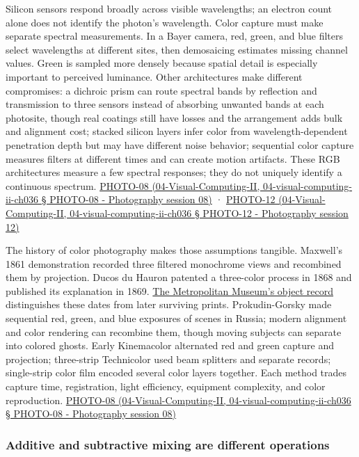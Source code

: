 Silicon sensors respond broadly across visible wavelengths; an electron count alone does not identify the photon's wavelength. Color capture must make separate spectral measurements. In a Bayer camera, red, green, and blue filters select wavelengths at different sites, then demosaicing estimates missing channel values. Green is sampled more densely because spatial detail is especially important to perceived luminance. Other architectures make different compromises: a dichroic prism can route spectral bands by reflection and transmission to three sensors instead of absorbing unwanted bands at each photosite, though real coatings still have losses and the arrangement adds bulk and alignment cost; stacked silicon layers infer color from wavelength-dependent penetration depth but may have different noise behavior; sequential color capture measures filters at different times and can create motion artifacts. These RGB architectures measure a few spectral responses; they do not uniquely identify a continuous spectrum. \href{}{PHOTO-08 (04-Visual-Computing-II, 04-visual-computing-ii-ch036 § PHOTO-08 - Photography session 08)} · \href{}{PHOTO-12 (04-Visual-Computing-II, 04-visual-computing-ii-ch036 § PHOTO-12 - Photography session 12)}

The history of color photography makes those assumptions tangible. Maxwell's 1861 demonstration recorded three filtered monochrome views and recombined them by projection. Ducos du Hauron patented a three-color process in 1868 and published its explanation in 1869. \href{https://www.metmuseum.org/art/collection/search/286318}{The Metropolitan Museum's object record} distinguishes these dates from later surviving prints. Prokudin-Gorsky made sequential red, green, and blue exposures of scenes in Russia; modern alignment and color rendering can recombine them, though moving subjects can separate into colored ghosts. Early Kinemacolor alternated red and green capture and projection; three-strip Technicolor used beam splitters and separate records; single-strip color film encoded several color layers together. Each method trades capture time, registration, light efficiency, equipment complexity, and color reproduction. \href{}{PHOTO-08 (04-Visual-Computing-II, 04-visual-computing-ii-ch036 § PHOTO-08 - Photography session 08)}

\subsubsection{Additive and subtractive mixing are different operations}\label{additive-and-subtractive-mixing-are-different-operations}

